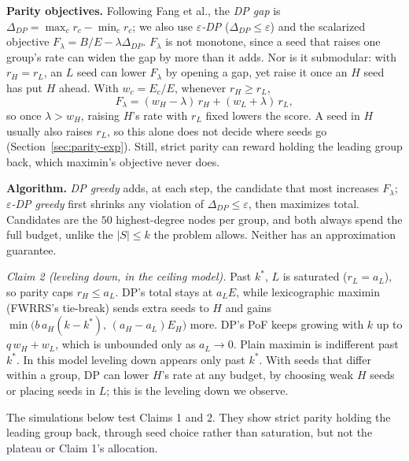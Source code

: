 
\textbf{Parity objectives.} Following Fang et al., the \emph{DP gap} is $\Delta_{DP}=\max_c r_c-\min_c r_c$; we also use \emph{$\varepsilon$-DP} ($\Delta_{DP}\le\varepsilon$) and the scalarized objective $F_\lambda=B/E-\lambda\Delta_{DP}$. $F_\lambda$ is not monotone, since a seed that raises one group's rate can widen the gap by more than it adds. Nor is it submodular: with $r_H=r_L$, an $L$ seed can lower $F_\lambda$ by opening a gap, yet raise it once an $H$ seed has put $H$ ahead. With $w_c=E_c/E$, whenever $r_H\ge r_L$,
\[
F_\lambda=(w_H-\lambda)\,r_H+(w_L+\lambda)\,r_L ,
\]
so once $\lambda>w_H$, raising $H$'s rate with $r_L$ fixed lowers the score. A seed in $H$ usually also raises $r_L$, so this alone does not decide where seeds go (Section~\ref{sec:parity-exp}). Still, strict parity can reward holding the leading group back, which maximin's objective never does.

\textbf{Algorithm.} \emph{DP greedy} adds, at each step, the candidate that most increases $F_\lambda$; \emph{$\varepsilon$-DP greedy} first shrinks any violation of $\Delta_{DP}\le\varepsilon$, then maximizes total. Candidates are the $50$ highest-degree nodes per group, and both always spend the full budget, unlike the $|S|\le k$ the problem allows. Neither has an approximation guarantee.

\emph{Claim 2 (leveling down, in the ceiling model).} Past $k^*$, $L$ is saturated ($r_L=a_L$), so parity caps $r_H\le a_L$. DP's total stays at $a_L E$, while lexicographic maximin (FWRRS's tie-break) sends extra seeds to $H$ and gains $\min\bigl(b\,a_H(k-k^*),\,(a_H-a_L)E_H\bigr)$ more. DP's PoF keeps growing with $k$ up to $q\,w_H+w_L$, which is unbounded only as $a_L\to0$. Plain maximin is indifferent past $k^*$. In this model leveling down appears only past $k^*$. With seeds that differ within a group, DP can lower $H$'s rate at any budget, by choosing weak $H$ seeds or placing seeds in $L$; this is the leveling down we observe.

The simulations below test Claims 1 and 2. They show strict parity holding the leading group back, through seed choice rather than saturation, but not the plateau or Claim 1's allocation.
